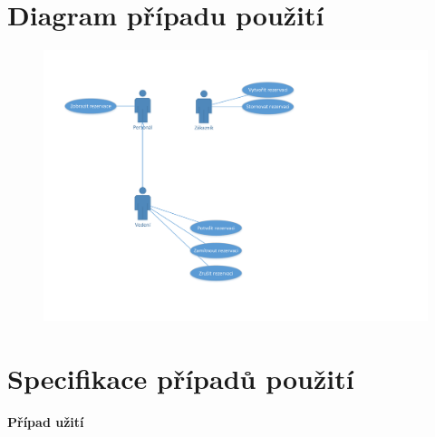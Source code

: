 \section*{Diagram případu použití}
\begin{figure}[h!]
\begin{center}
\includegraphics[scale=0.75]{resources/iteration01.pdf}
\label{fig:iteration01}
\end{center}
\end{figure}

\newpage
\section*{Specifikace případů použití}
\textbf{Případ užití }

